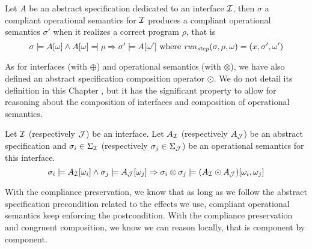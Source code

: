 \begin{theorem}
  Let $A$ be an abstract specification dedicated to an interface $\mathcal{I}$, then
  $\sigma$ a compliant operational semantics for $\mathcal{I}$ produces a compliant
  operational semantics $\sigma'$ when it realizes a correct program $\rho$,
  that is
  \[
    \sigma \models A[\omega] \wedge A[\omega] \modelssym \rho \Rightarrow
    \sigma' \models A[\omega'] \text{ where }\func{run}_{\func{step}}(\sigma,
    \rho, \omega) = (x, \sigma', \omega')
  \]
\end{theorem}

As for interfaces (with $\oplus$) and operational semantics (with $\otimes$), we
have also defined an abstract specification composition operator $\odot$.
%
We do not detail its definition in this Chapter , but it has the significant
property to allow for reasoning about the composition of interfaces and
composition of operational semantics.

\begin{theorem}
  Let $\mathcal{I}$ (respectively $\mathcal{J}$) be an interface.
  Let $A_{\mathcal{I}}$ (respectively $A_{\mathcal{J}}$) be an abstract specification and
  $\sigma_i \in \Sigma_{\mathcal{I}}$ (respectively $\sigma_j \in \Sigma_{\mathcal{J}}$) be an
  operational semantics for this interface.
  \[ \sigma_i \models A_{\mathcal{I}}[\omega_i] \wedge \sigma_j \models A_{\mathcal{J}}[\omega_j]
    \Rightarrow \sigma_i \otimes \sigma_j \models (A_{\mathcal{I}} \odot
    A_{\mathcal{J}})[\omega_i, \omega_j]
  \]
\end{theorem}


With the compliance preservation, we know that as long as we follow the abstract
specification precondition related to the effects we use, compliant operational
semantics keep enforcing the postcondition.
%
With the compliance preservation and congruent composition, we know we can
reason locally, that is component by component.

